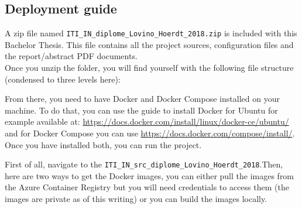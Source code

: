 \documentclass[twoside, openright,11pt,a4paper]{book}
\begin{document}
\begin{appendices}
\appendixpage
\chapter{Deployment guide}
A zip file named \verb+ITI_IN_diplome_Lovino_Hoerdt_2018.zip+ is included with this Bachelor Thesis. This file contains all the project sources, configuration files and the report/abstract PDF documents.\\

Once you unzip the folder, you will find yourself with the following file structure (condensed to three levels here):

From there, you need to have Docker and Docker Compose installed on your machine. To do that, you can use the guide to install Docker for Ubuntu for example available at: \url{https://docs.docker.com/install/linux/docker-ce/ubuntu/} and for Docker Compose you can use \url{https://docs.docker.com/compose/install/}. Once you have installed both, you can run the project.

First of all, navigate to the \verb+ITI_IN_src_diplome_Lovino_Hoerdt_2018+.Then, here are two ways to get the Docker images, you can either pull the images from the Azure Container Registry but you will need credentials to access them (the images are private as of this writing) or you can build the images locally.


\end{appendices}
\end{document}
